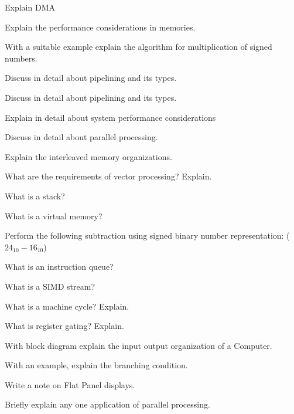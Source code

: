 \newpage \again

\item \iitem \iitem Explain DMA
\item Explain the performance considerations in memories.
\ene
\Or
\item With a suitable example explain the algorithm for multiplication
  of signed numbers.
\ene

\item \iitem Discuss in detail about pipelining and its types.
\Or

\item Discuss in detail about pipelining and its types.
\Or
\item Explain in detail about
\iitem system performance considerations
\ene
\ene


\item \iitem Discuss in detail about parallel processing.
\Or
\item \iitem Explain the interleaved memory organizations.
\item What are the requirements of vector processing? Explain.
\ene
\ene
 
\markC
\ene

\newpage

\sub{\subj}
\maxtime

\partA

\iitem What is a stack?
\item What is a virtual memory?
\item Perform the following subtraction using signed binary number
  representation: ($24_{10} - 16_{10}$)
\item What is an instruction queue?
\item What is a SIMD stream?

\markA
\markB

\item What is a machine cycle? Explain.
\item What is register gating? Explain.
\item With block diagram explain the input output organization of
  a Computer.
\item With an example, explain the branching condition.
\item Write a note on Flat Panel displays.
\item Briefly explain any one application of parallel processing.

\markB
\ene
